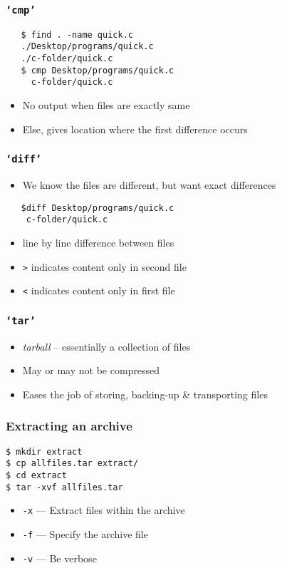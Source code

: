 \documentclass[17pt,compress]{beamer}
\begin{document}
\begin{frame}[fragile]
  \frametitle{\texttt{`cmp'}}
  \begin{lstlisting}
   $ find . -name quick.c
   ./Desktop/programs/quick.c
   ./c-folder/quick.c
   $ cmp Desktop/programs/quick.c 
     c-folder/quick.c
  \end{lstlisting} %
  \begin{itemize}
  \item No output when files are exactly same
  \item Else, gives location where the first difference occurs 
  \end{itemize}
\end{frame}

\begin{frame}[fragile]
  \frametitle{\texttt{`diff'}}
  \begin{itemize}
  \item We know the files are different, but want exact differences
  \end{itemize}
  \begin{lstlisting}
   $diff Desktop/programs/quick.c 
    c-folder/quick.c
  \end{lstlisting} %
  \begin{itemize}
  \item line by line difference between files
  \item \texttt{>} indicates content only in second file
  \item \texttt{<} indicates content only in first file
  \end{itemize}
\end{frame}

\begin{frame}[fragile]
\frametitle{\texttt{`tar'}}
\begin{itemize}
\item \emph{tarball} -- essentially a collection of files
\item May or may not be compressed
\item Eases the job of storing, backing-up \& transporting files
\end{itemize}
\end{frame}

\begin{frame}[fragile]
\frametitle{Extracting an archive}

\begin{lstlisting}
$ mkdir extract 
$ cp allfiles.tar extract/ 
$ cd extract 
$ tar -xvf allfiles.tar
\end{lstlisting} %

\begin{itemize}
\item \texttt{-x} --- Extract files within the archive
\item \texttt{-f} --- Specify the archive file
\item \texttt{-v} --- Be verbose
\end{itemize}
\end{frame}
\end{document}
